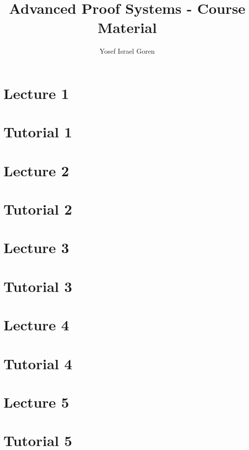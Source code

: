 \documentclass{article}
\title{Advanced Proof Systems - Course Material}
\author{Yosef Israel Goren}
\begin{document}
\maketitle

\part*{Lecture 1}

\part*{Tutorial 1}

\part*{Lecture 2}

\part*{Tutorial 2}

\part*{Lecture 3}

\part*{Tutorial 3}

\part*{Lecture 4}

\part*{Tutorial 4}

\part*{Lecture 5}

\part*{Tutorial 5}

\end{document}
